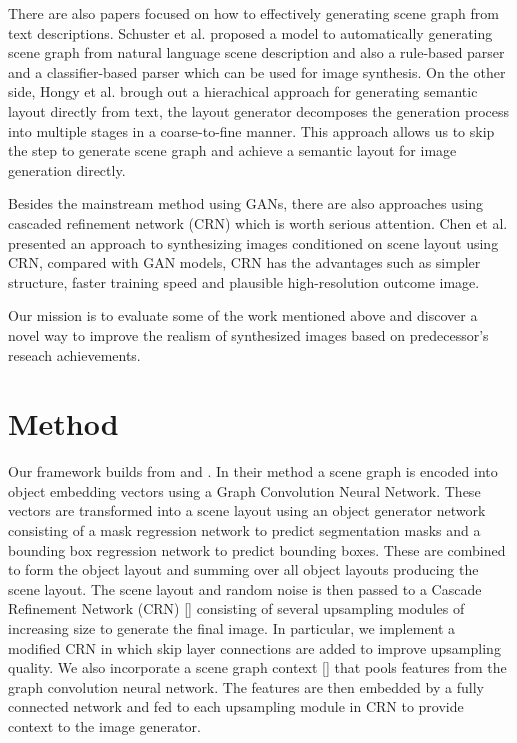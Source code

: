 \documentclass{article}
\begin{document}
There are also papers focused on how to effectively generating scene graph from text descriptions. Schuster et al. \cite{scenegraph} proposed a model to automatically generating scene graph from natural language scene description and also a rule-based parser and a classifier-based parser which can be used for image synthesis. On the other side, Hongy et al. brough out a hierachical approach for generating semantic layout directly from text, the layout generator decomposes the generation process into multiple stages in a coarse-to-fine manner. This approach allows us to skip the step to generate scene graph and achieve a semantic layout for image generation directly.

Besides the mainstream method using GANs, there are also approaches using cascaded refinement network (CRN) which is worth serious attention. Chen et al. \cite{crn} presented an approach to synthesizing images conditioned on scene layout using CRN, compared with GAN models, CRN has the advantages such as simpler structure, faster training speed and plausible high-resolution outcome image. 

Our mission is to evaluate some of the work mentioned above and discover a novel way to improve the realism of synthesized images based on predecessor's reseach achievements.


\section{Method}

Our framework builds from \cite{sg2im} and \cite{sg2imgcontext}. In their method a scene graph is encoded into object embedding vectors using a Graph Convolution Neural Network. These vectors are transformed into a scene layout using an object generator network consisting of a mask regression network to predict segmentation masks and a bounding box regression network to predict bounding boxes. These are combined to form the object layout and summing over all object layouts producing the scene layout. The scene layout and random noise is then passed to a Cascade Refinement Network (CRN) [\cite{crn}] consisting of several upsampling modules of increasing size to generate the final image. In particular, we implement a modified CRN in which skip layer connections are added to improve upsampling quality. We also incorporate a scene graph context [\cite{sg2imgcontext}] that pools features from the graph convolution neural network. The features are then embedded by a fully connected network and fed to each upsampling module in CRN to provide context to the image generator.
\end{document}
